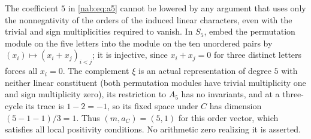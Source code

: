 \begin{remark}\label{nab:rem:five}
The coefficient $5$ in \eqref{nab:eq:a5} cannot be lowered by any argument that uses only
the nonnegativity of the orders of the induced linear characters, even with the trivial and
sign multiplicities required to vanish. In $S_5$, embed the permutation module on the five
letters into the module on the ten unordered pairs by $(x_i)\mapsto(x_i+x_j)_{i<j}$; it is
injective, since $x_i+x_j=0$ for three distinct letters forces all $x_i=0$. The complement
$\xi$ is an actual representation of degree $5$ with neither linear constituent (both
permutation modules have trivial multiplicity one and sign multiplicity zero), its
restriction to $A_5$ has no invariants, and at a three-cycle its trace is $1-2=-1$, so its
fixed space under $C$ has dimension $(5-1-1)/3=1$. Thus $(m,a_C)=(5,1)$ for this order
vector, which satisfies all local positivity conditions. No arithmetic zero realizing it
is asserted.
\end{remark}

